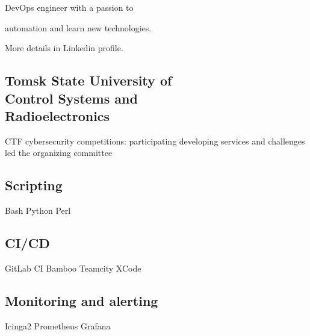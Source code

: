 \documentclass[a4paper]{MagicalCV}
\begin{document}
\lastupdated


\begin{minipage}[t]{0.33\textwidth} 


DevOps engineer with a passion to

automation and learn new technologies.

More details in Linkedin profile.
\sectionsep




\sectionsep


\subsection{Tomsk State University of \\ Control Systems and \\ Radioelectronics}
\vspace{\topsep} %
CTF cybersecurity competitions: participating \textbullet{} developing services and challenges \textbullet{} led the organizing committee
\sectionsep


\subsection{Scripting}
Bash \textbullet{} Python \textbullet{} Perl 
\subsection{CI/CD}
GitLab CI \textbullet{} Bamboo \textbullet{} Teamcity \textbullet{} XCode
\subsection{Monitoring and alerting}
Icinga2 \textbullet{} Prometheus \textbullet{} Grafana

\end{minipage}
\end{document}
